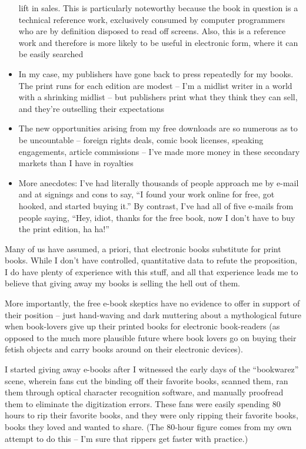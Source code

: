 \begin{itemize}
  lift in sales. This is particularly noteworthy because the book in
  question is a technical reference work, exclusively consumed by
  computer programmers who are by definition disposed to read off
  screens. Also, this is a reference work and therefore is more
  likely to be useful in electronic form, where it can be easily
  searched
\item
  In my case, my publishers have gone back to press repeatedly for my
  books. The print runs for each edition are modest -- I'm a midlist
  writer in a world with a shrinking midlist -- but publishers print
  what they think they can sell, and they're outselling their
  expectations
\item
  The new opportunities arising from my free downloads are so
  numerous as to be uncountable -- foreign rights deals, comic book
  licenses, speaking engagements, article commissions -- I've made
  more money in these secondary markets than I have in royalties
\item
  More anecdotes: I've had literally thousands of people approach me
  by e-mail and at signings and cons to say, ``I found your work
  online for free, got hooked, and started buying it.'' By contrast,
  I've had all of five e-mails from people saying, ``Hey, idiot,
  thanks for the free book, now I don't have to buy the print
  edition, ha ha!''
\end{itemize}
Many of us have assumed, a priori, that electronic books substitute
for print books. While I don't have controlled, quantitative data
to refute the proposition, I do have plenty of experience with this
stuff, and all that experience leads me to believe that giving away
my books is selling the hell out of them.

More importantly, the free e-book skeptics have no evidence to
offer in support of their position -- just hand-waving and dark
muttering about a mythological future when book-lovers give up
their printed books for electronic book-readers (as opposed to the
much more plausible future where book lovers go on buying their
fetish objects and carry books around on their electronic
devices).

I started giving away e-books after I witnessed the early days of
the ``bookwarez'' scene, wherein fans cut the binding off their
favorite books, scanned them, ran them through optical character
recognition software, and manually proofread them to eliminate the
digitization errors. These fans were easily spending 80 hours to
rip their favorite books, and they were only ripping their favorite
books, books they loved and wanted to share. (The 80-hour figure
comes from my own attempt to do this -- I'm sure that rippers get
faster with practice.)

